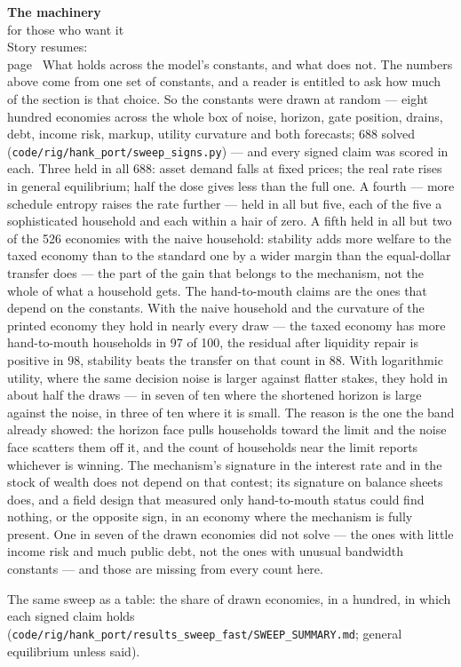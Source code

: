\begin{machinery}{\textbf{The machinery}\\for those who want it\\[3pt]{\color{muted}Story resumes:\\page~\pageref{ch15}}}
What holds across the model's constants, and what does not. The
numbers above come from one set of constants, and a reader is entitled
to ask how much of the section is that choice. So the constants were
drawn at random --- eight hundred economies across the whole box of
noise, horizon, gate position, drains, debt, income risk, markup,
utility curvature and both forecasts; 688 solved
(\texttt{code/\allowbreak{}rig/\allowbreak{}hank\_\allowbreak{}port/\allowbreak{}sweep\_\allowbreak{}signs.\allowbreak{}py}) --- and every signed claim was
scored in each. Three held in all 688: asset demand falls at fixed
prices; the real rate rises in general equilibrium; half the dose
gives less than the full one. A fourth --- more schedule entropy raises
the rate further --- held in all but five, each of the five a
sophisticated household and each within a hair of zero. A fifth held
in all but two of the 526 economies with the naive household:
stability adds more welfare to the taxed economy than to the
standard one by a wider margin than the equal-dollar transfer does ---
the part of the gain that belongs to the mechanism, not the whole of
what a household gets.
The hand-to-mouth claims are the
ones that depend on the constants. With the naive household and the
curvature of the printed economy they hold in nearly every draw --- the taxed economy has more
hand-to-mouth households in 97 of 100, the residual after liquidity
repair is positive in 98, stability beats the transfer on that count
in 88. With logarithmic utility, where the same decision noise is
larger against flatter stakes, they hold in about half the draws ---
in seven of ten where the shortened horizon is large against the
noise, in three of ten where it is small. The reason is the one the
band already showed: the horizon
face pulls households toward the limit and the noise face scatters
them off it, and the count of households near the limit reports
whichever is winning. The mechanism's signature in the interest rate
and in the stock of wealth does not depend on that contest; its
signature on
balance sheets does, and a field design that measured only
hand-to-mouth status could find nothing, or the opposite sign, in an
economy where the mechanism is fully present. One in seven of the
drawn economies did not solve --- the ones with little income risk and
much public debt, not the ones with unusual bandwidth constants --- and
those are missing from every count here.

\tableneed{94pt}

The same sweep as a table: the share of drawn economies, in a hundred, in which each signed claim holds (\texttt{code/\allowbreak{}rig/\allowbreak{}hank\_\allowbreak{}port/\allowbreak{}results\_\allowbreak{}sweep\_\allowbreak{}fast/\allowbreak{}SWEEP\_\allowbreak{}SUMMARY.\allowbreak{}md}; general equilibrium unless said).


\end{machinery}
